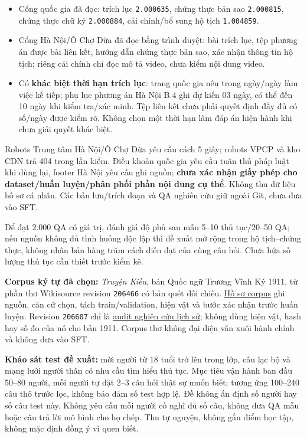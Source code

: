 \documentclass[11pt,a4paper]{article}
\providecommand{\tightlist}{\setlength{\itemsep}{0pt}\setlength{\parskip}{0pt}}
\begin{document}
\begin{itemize}
\tightlist
\item
  Cổng quốc gia đã đọc: trích lục \nolinkurl{2.000635}, chứng thực bản
  sao \nolinkurl{2.000815}, chứng thực chữ ký \nolinkurl{2.000884}, cải
  chính/bổ sung hộ tịch \nolinkurl{1.004859}.
\item
  Cổng Hà Nội/Ô Chợ Dừa đã đọc bằng trình duyệt: bài trích lục, tệp
  phương án được bài liên kết, hướng dẫn chứng thực bản sao, xác nhận
  thông tin hộ tịch; riêng cải chính chỉ đọc mô tả video, chưa kiểm nội
  dung video.
\item
  Có \textbf{khác biệt thời hạn trích lục}: trang quốc gia nêu trong
  ngày/ngày làm việc kế tiếp; phụ lục phương án Hà Nội B.4 ghi dự kiến
  03 ngày, có thể đến 10 ngày khi kiểm tra/xác minh. Tệp liên kết chưa
  phải quyết định đầy đủ có số/ngày được kiểm rõ. Không chọn một thời
  hạn làm đáp án hiện hành khi chưa giải quyết khác biệt.
\end{itemize}

Robots Trung tâm Hà Nội/Ô Chợ Dừa yêu cầu cách 5 giây; robots VPCP và
kho CDN trả 404 trong lần kiểm. Điều khoản quốc gia yêu cầu tuân thủ
pháp luật khi dùng lại, footer Hà Nội yêu cầu ghi nguồn; \textbf{chưa
xác nhận giấy phép cho dataset/huấn luyện/phân phối phần nội dung cụ
thể}. Không thu dữ liệu hồ sơ cá nhân. Các bản lưu/trích đoạn và QA
nghiên cứu giữ ngoài Git, chưa đưa vào SFT.

Để đạt 2.000 QA có giá trị, đánh giá độ phủ sau mẫu 5--10 thủ tục/20--50
QA; nếu nguồn không đủ tình huống độc lập thì đề xuất mở rộng trong hộ
tịch--chứng thực, không nhân bản hàng trăm cách diễn đạt của cùng câu
hỏi. Chưa hứa số lượng thủ tục cần thiết trước kiểm kê.

\textbf{Corpus ký tự đã chọn:} \emph{Truyện Kiều}, bản Quốc ngữ Trương
Vĩnh Ký 1911, từ phần thơ Wikisource revision \nolinkurl{206466} có bản
quét đối chiếu. \href{../data/char-corpus.md}{Hồ sơ corpus} ghi nguồn,
căn cứ chọn, tách train/validation, hiện vật và bước xác nhận trước huấn
luyện. Revision \nolinkurl{206607} chỉ là
\href{../data/char-corpus-audit-report.json}{audit nghiên cứu lịch sử};
không dùng hiện vật, hash hay số đo của nó cho bản 1911. Corpus thơ
không đại diện văn xuôi hành chính và không đưa vào SFT.

\textbf{Khảo sát test đề xuất:} mời người từ 18 tuổi trở lên trong lớp,
câu lạc bộ và mạng lưới người thân có nhu cầu tìm hiểu thủ tục. Mục tiêu
vận hành ban đầu 50--80 người, mỗi người tự đặt 2--3 câu hỏi thật sự
muốn biết; tương ứng 100--240 câu thô trước lọc, không bảo đảm số test
hợp lệ. Đề không ấn định số người hay số câu test này. Không yêu cầu mỗi
người cố nghĩ đủ số câu, không đưa QA mẫu hoặc câu trả lời mô hình cho
họ chép. Thu tự nguyện, không gắn điểm học tập, không mặc định đồng ý vì
quen biết.
\end{document}
